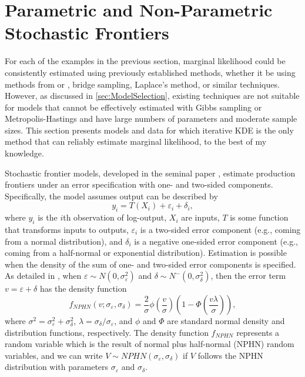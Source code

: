 \documentclass[twocolumn]{article}
\newcommand{\ep}{\varepsilon}
\begin{document}
\section{Parametric and Non-Parametric Stochastic Frontiers}

\label{sec:SF}

For each of the examples in the previous section, marginal likelihood could be consistently estimated using previously established methods, whether it be using methods from \cite{Chib} or \cite{ChibJeliazkov}, bridge sampling, Laplace's method, or similar techniques. However, as discussed in \cref{sec:ModelSelection}, existing techniques are not suitable for models that cannot be effectively estimated with Gibbs sampling or Metropolis-Hastings and have large numbers of parameters and moderate sample sizes. This section presents models and data for which iterative KDE is the only method that can reliably estimate marginal likelihood, to the best of my knowledge.

Stochastic frontier models, developed in the seminal paper \cite{AignerLovellSchmidt}, estimate production frontiers under an error specification with one- and two-sided components. Specifically, the model assumes output can be described by
\begin{equation}
	y_i = T(X_i) + \ep_i + \delta_i,
\end{equation}
where $y_i$ is the $i$th observation of log-output, $X_i$ are inputs, $T$ is some function that transforms inputs to outputs, $\ep_i$ is a two-sided error component (e.g., coming from a normal distribution), and $\delta_i$ is a negative one-sided error component (e.g., coming from a half-normal or exponential distribution). Estimation is possible when the density of the sum of one- and two-sided error components is specified. As detailed in \cite{AignerLovellSchmidt}, when $\ep\sim N(0, \sigma_\ep^2)$ and $\delta\sim N^-(0, \sigma_\delta^2)$, then the error term $v = \ep + \delta$ has the density function
\begin{equation}
	\label{eq:sfDensity}
	f_{NPHN}(v; \sigma_\ep, \sigma_\delta) = \frac2\sigma \phi\left(\frac{v}\sigma\right)\left(1 - \Phi\left(\frac{v\lambda}{\sigma}\right)\right),
\end{equation}
where $\sigma^2 = \sigma_\ep^2 + \sigma_\delta^2$, $\lambda = \sigma_\delta / \sigma_\ep$, and $\phi$ and $\Phi$ are standard normal density and distribution functions, respectively. The density function $f_{NPHN}$ represents a random variable which is the result of normal plus half-normal (NPHN) random variables, and we can write $V\sim NPHN(\sigma_\ep, \sigma_\delta)$ if $V$ follows the NPHN distribution with parameters $\sigma_\ep$ and $\sigma_\delta$.
\end{document}
